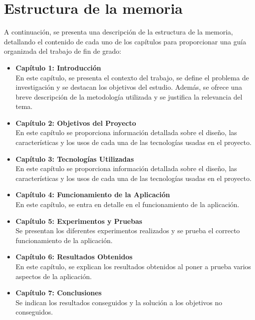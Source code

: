 \documentclass[a4paper, 12pt]{book}
\begin{document}
\section{Estructura de la memoria}
\label{sec:seccion}

A continuación, se presenta una descripción de la estructura de la memoria, detallando el contenido de cada uno de los capítulos para proporcionar una guía organizada del trabajo de fin de grado:

\begin{itemize}
  \item \textbf{Capítulo 1: Introducción} \\
  En este capítulo, se presenta el contexto del trabajo, se define el problema de investigación y se destacan los objetivos del estudio. Además, se ofrece una breve descripción de la metodología utilizada y se justifica la relevancia del tema.
  
  \item \textbf{Capítulo 2: Objetivos del Proyecto} \\
  En este capítulo se proporciona información detallada sobre el diseño, las características y los usos de cada una de las tecnologías usadas en el proyecto.
  
  \item \textbf{Capítulo 3: Tecnologías Utilizadas} \\
  En este capítulo se proporciona información detallada sobre el diseño, las características y los usos de cada una de las tecnologías usadas en el proyecto.
  
  \item \textbf{Capítulo 4: Funcionamiento de la Aplicación} \\
  En este capítulo, se entra en detalle en el funcionamiento de la aplicación.
  
  \item \textbf{Capítulo 5: Experimentos y Pruebas} \\
  Se presentan los diferentes experimentos realizados y se prueba el correcto funcionamiento de la aplicación.
  
  \item \textbf{Capítulo 6: Resultados Obtenidos} \\
  En este capítulo, se explican los resultados obtenidos al poner a prueba varios aspectos de la aplicación.
  
  \item \textbf{Capítulo 7: Conclusiones} \\
    Se indican los resultados conseguidos y la solución a los objetivos no conseguidos.
\end{itemize}
\end{document}

